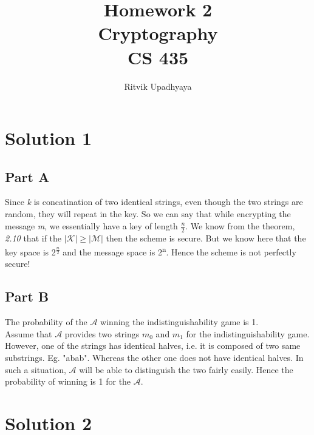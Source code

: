 \documentclass{article}
\title{\Huge Homework 2
		\\\LARGE Cryptography
		\\\LARGE CS 435
		\vspace{2pc}}
\author{Ritvik Upadhyaya}
\date{}
\begin{document}
	\maketitle

	\newpage

	\section*{Solution 1}
        \subsection*{Part A}
            Since \textit{k} is concatination of two identical strings, even though the two strings are random, they will repeat in the key. So we can say that while encrypting the message \textit{m}, we essentially have a key of length $\frac{n}{2}$. We know from the theorem, \textit{2.10} that if the $|\mathcal{K}| \geq |\mathcal{M}|$ then the scheme is secure. But we know here that the key space is 2\textsuperscript{$\frac{n}{2}$} and the message space is 2\textsuperscript{n}. Hence the scheme is not perfectly secure!

        \subsection*{Part B}
            The probability of the $\mathcal{A}$ winning the indistinguishability game is 1.\\
            Assume that $\mathcal{A}$ provides two strings $m_0$ and $m_1$ for the indistinguishability game.\\
            However, one of the strings has identical halves, i.e. it is composed of two same substrings. Eg. "abab". Whereas the other one does not have identical halves. In such a situation, $\mathcal{A}$ will be able to distinguish the two fairly easily. Hence the probability of winning is 1 for the $\mathcal{A}$.
            
    \section*{Solution 2}
\end{document}
